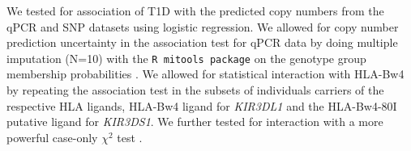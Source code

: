 We tested for association of T1D with the predicted copy numbers from the qPCR and SNP datasets using logistic regression.
We allowed for copy number prediction uncertainty in the association test for qPCR data by doing multiple imputation (N=10)
with the \texttt{R mitools package} \citep{mitools} on the genotype group membership probabilities \citep{Cordell:2006da}. 
We allowed for statistical interaction with HLA-Bw4 by repeating the association test
in the subsets of individuals carriers of the respective HLA ligands,
HLA-Bw4 ligand for \emph{KIR3DL1} and the HLA-Bw4-80I putative ligand for \emph{KIR3DS1}.
We further tested for interaction with a more powerful case-only $\chi^2$ test \citep{Yang:1999wk,Cordell:2009jb}.





